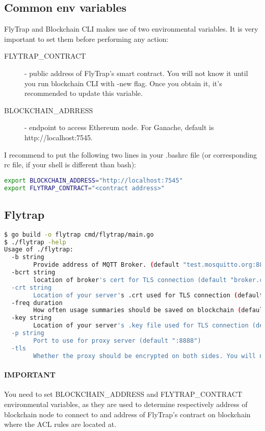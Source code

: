\subsection{Common env variables}\label{sec:envvars}
FlyTrap and Blockchain CLI makes use of two environmental variables. It is very important to set them before performing any action:
\begin{description}
  \item[FLYTRAP\_CONTRACT] - public address of FlyTrap's smart contract. You will not know it until you run blockchain CLI with -new flag. Once you obtain it, it's recommended to update this variable.
  \item[BLOCKCHAIN\_ADRRESS] - endpoint to access Ethereum node. For Ganache, default is http://localhost:7545.
\end{description}
I recommend to put the following two lines in your .bashrc file (or corresponding rc file, if your shell is different than bash):
\begin{lstlisting}[language=bash,breaklines=true]
export BLOCKCHAIN_ADDRESS="http://localhost:7545"
export FLYTRAP_CONTRACT="<contract address>"
\end{lstlisting}
\subsection{Flytrap}
\begin{lstlisting}[language=bash,breaklines=true]
$ go build -o flytrap cmd/flytrap/main.go
$ ./flytrap -help
Usage of ./flytrap:
  -b string
    	Provide address of MQTT Broker. (default "test.mosquitto.org:8883")
  -bcrt string
    	location of broker's cert for TLS connection (default "broker.crt")
  -crt string
    	Location of your server's .crt used for TLS connection (default "server.crt")
  -freq duration
    	How often usage summaries should be saved on blockchain (default 30s)
  -key string
    	Location of your server's .key file used for TLS connection (default "server.key")
  -p string
    	Port to use for proxy server (default ":8888")
  -tls
    	Whether the proxy should be encrypted on both sides. You will need to provide .crt and .key files if so. (default true)
\end{lstlisting}
\paragraph{IMPORTANT} You need to set BLOCKCHAIN\_ADDRESS and FLYTRAP\_CONTRACT environmental variables, as they are used to determine respectively address of blockchain node to connect to and address of FlyTrap's contract on blockchain where the ACL rules are located at. 
